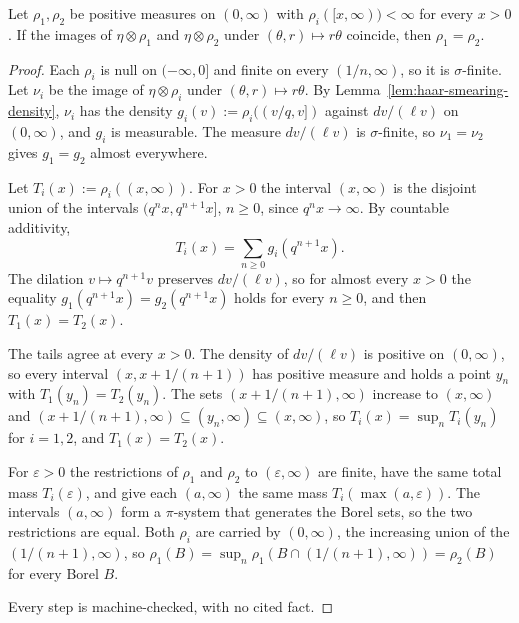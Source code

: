 \begin{lemma}
\label{lem:haar-smearing-injective}

Let $\rho_1, \rho_2$ be positive measures on $(0,\infty)$ with $\rho_i([x,\infty)) < \infty$ for
every $x > 0$. If the images of $\eta \otimes \rho_1$ and $\eta \otimes \rho_2$ under
$(\theta, r) \mapsto r\theta$ coincide, then $\rho_1 = \rho_2$.
\end{lemma}

\begin{proof}
Each $\rho_i$ is null on $(-\infty,0]$ and finite on every $(1/n,\infty)$, so it is
$\sigma$-finite. Let $\nu_i$ be the image of $\eta \otimes \rho_i$ under
$(\theta, r) \mapsto r\theta$. By Lemma~\ref{lem:haar-smearing-density}, $\nu_i$ has the density
$g_i(v) := \rho_i((v/q,v])$ against $dv/(\ell v)$ on $(0,\infty)$, and $g_i$ is measurable. The measure $dv/(\ell v)$ is $\sigma$-finite, so $\nu_1 = \nu_2$ gives
$g_1 = g_2$ almost everywhere.

Let $T_i(x) := \rho_i((x,\infty))$. For $x > 0$ the interval $(x,\infty)$ is the disjoint union
of the intervals $(q^nx, q^{n+1}x]$, $n \ge 0$, since $q^nx \to \infty$. By countable additivity,
\[
  T_i(x) = \sum_{n \ge 0} g_i(q^{n+1}x).
\]
The dilation $v \mapsto q^{n+1}v$ preserves $dv/(\ell v)$, so for almost every $x > 0$ the equality
$g_1(q^{n+1}x) = g_2(q^{n+1}x)$ holds for every $n \ge 0$, and then $T_1(x) = T_2(x)$.

The tails agree at every $x > 0$. The density of $dv/(\ell v)$ is positive on $(0,\infty)$, so
every interval $(x, x + 1/(n+1))$ has positive measure and holds a point $y_n$ with
$T_1(y_n) = T_2(y_n)$. The sets $(x + 1/(n+1), \infty)$ increase to $(x,\infty)$ and
$(x + 1/(n+1), \infty) \subseteq (y_n,\infty) \subseteq (x,\infty)$, so
$T_i(x) = \sup_n T_i(y_n)$ for $i = 1, 2$, and $T_1(x) = T_2(x)$.

For $\varepsilon > 0$ the restrictions of $\rho_1$ and $\rho_2$ to $(\varepsilon,\infty)$ are
finite, have the same total mass $T_i(\varepsilon)$, and give each $(a,\infty)$ the same mass
$T_i(\max(a,\varepsilon))$. The intervals $(a,\infty)$ form a $\pi$-system that generates the Borel
sets, so the two restrictions are equal. Both $\rho_i$ are carried by $(0,\infty)$, the increasing
union of the $(1/(n+1),\infty)$, so
$\rho_1(B) = \sup_n\rho_1(B \cap (1/(n+1),\infty)) = \rho_2(B)$ for every Borel $B$.

Every step is machine-checked, with no cited fact.
\end{proof}

